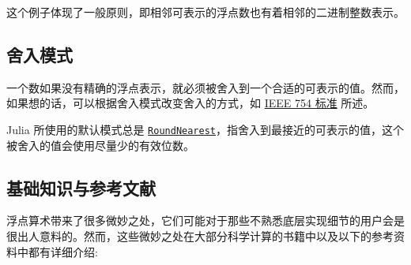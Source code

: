 这个例子体现了一般原则，即相邻可表示的浮点数也有着相邻的二进制整数表示。



\hypertarget{5125794393878787955}{}


\subsection{舍入模式}



一个数如果没有精确的浮点表示，就必须被舍入到一个合适的可表示的值。然而，如果想的话，可以根据舍入模式改变舍入的方式，如 \href{https://en.wikipedia.org/wiki/IEEE\_754-2008}{IEEE 754 标准} 所述。 



Julia 所使用的默认模式总是 \hyperlink{868115654703135309}{\texttt{RoundNearest}}，指舍入到最接近的可表示的值，这个被舍入的值会使用尽量少的有效位数。



\hypertarget{6428114724945706317}{}


\subsection{基础知识与参考文献}



浮点算术带来了很多微妙之处，它们可能对于那些不熟悉底层实现细节的用户会是很出人意料的。然而，这些微妙之处在大部分科学计算的书籍中以及以下的参考资料中都有详细介绍:



